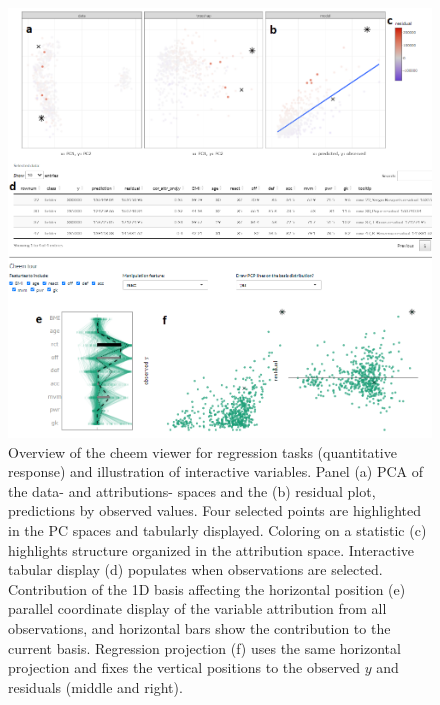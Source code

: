 \documentclass[
]{jss}
\begin{document}
\begin{CodeChunk}
\begin{figure}

{\centering \includegraphics[width=1\linewidth]{./figures/app_regression_interactions} 

}

\caption[Overview of the cheem viewer for regression tasks (quantitative response) and illustration of interactive variables]{Overview of the cheem viewer for regression tasks (quantitative response) and illustration of interactive variables. Panel (a) PCA of the data- and attributions- spaces and the (b) residual plot, predictions by observed values. Four selected points are highlighted in the PC spaces and tabularly displayed. Coloring on a statistic (c) highlights structure organized in the attribution space. Interactive tabular display (d) populates when observations are selected. Contribution of the 1D basis affecting the horizontal position (e) parallel coordinate display of the variable attribution from all observations, and horizontal bars show the contribution to the current basis. Regression projection (f) uses the same horizontal projection and fixes the vertical positions to the observed $y$ and residuals (middle and right).}\label{fig:regressioncase}
\end{figure}
\end{CodeChunk}
\end{document}
